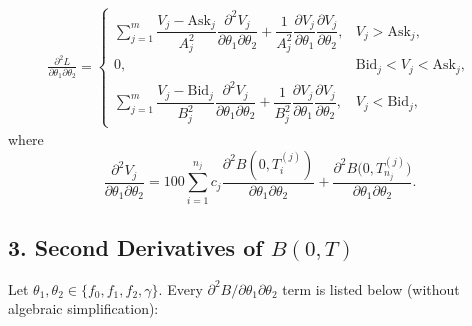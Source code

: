 \documentclass[12pt]{article}
\begin{document}
\begin{align}
\frac{\partial^{2} L}{\partial\theta_1\partial\theta_2}
  =
  \begin{cases}
  \sum_{j=1}^{m}  \dfrac{V_j-\mathrm{Ask}_j}{A_j^{2}}
      \dfrac{\partial^{2}V_j}{\partial\theta_1\partial\theta_2}
    +\dfrac{1}{A_j^{2}}
      \dfrac{\partial V_j}{\partial\theta_1}
      \dfrac{\partial V_j}{\partial\theta_2},
      & V_j>\mathrm{Ask}_j,\\[0.8em]
    0, & \mathrm{Bid}_j<V_j<\mathrm{Ask}_j,\\[0.8em]
   \sum_{j=1}^{m} \dfrac{V_j-\mathrm{Bid}_j}{B_j^{2}}
      \dfrac{\partial^{2}V_j}{\partial\theta_1\partial\theta_2}
    +\dfrac{1}{B_j^{2}}
      \dfrac{\partial V_j}{\partial\theta_1}
      \dfrac{\partial V_j}{\partial\theta_2},
      & V_j<\mathrm{Bid}_j,
  \end{cases}
\end{align}
where
\[
\frac{\partial^{2}V_j}{\partial\theta_1\partial\theta_2}
  =100\sum_{i=1}^{n_j} c_j
      \frac{\partial^{2}B(0,T^{(j)}_i)}
           {\partial\theta_1\partial\theta_2}
     +\frac{\partial^{2}B\!\bigl(0,T^{(j)}_{n_j}\bigr)}
           {\partial\theta_1\partial\theta_2}.
\]

\subsection*{3. Second Derivatives of \(B(0,T)\)}

Let \(\theta_1,\theta_2\in\{f_0,f_1,f_2,\gamma\}\).
Every \(\partial^{2}B/\partial\theta_1\partial\theta_2\) term is listed below
(without algebraic simplification):
\end{document}
